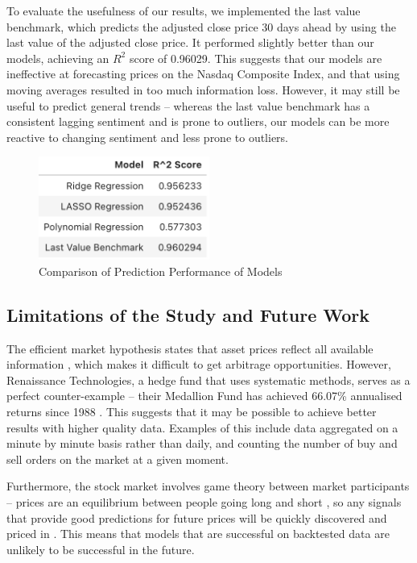 \documentclass[a4paper, 11pt]{article}
\begin{document}
To evaluate the usefulness of our results, we implemented the last value benchmark, which predicts the adjusted close price 30 days ahead by using the last value of the adjusted close price. It performed slightly better than our models, achieving an $R^2$ score of 0.96029. This suggests that our models are ineffective at forecasting prices on the Nasdaq Composite Index, and that using moving averages resulted in too much information loss. However, it may still be useful to predict general trends -- whereas the last value benchmark has a consistent lagging sentiment and is prone to outliers, our models can be more reactive to changing sentiment and less prone to outliers.

\begin{figure}[H]
    \begin{center}
        \includegraphics[width=0.5\textwidth]{Model Results Table.png}
        \caption{Comparison of Prediction Performance of Models}
    \end{center}
\end{figure}

\subsection{Limitations of the Study and Future Work}
The efficient market hypothesis states that asset prices reflect all available information \cite{fama1970efficient}, which makes it difficult to get arbitrage opportunities. However, Renaissance Technologies, a hedge fund that uses systematic methods, serves as a perfect counter-example -- their Medallion Fund has achieved 66.07\% annualised returns since 1988 \cite{cornell2020medallion}. This suggests that it may be possible to achieve better results with higher quality data. Examples of this include data aggregated on a minute by minute basis rather than daily, and counting the number of buy and sell orders on the market at a given moment.

Furthermore, the stock market involves game theory between market participants \cite{allen1998finance} -- prices are an equilibrium between people going long and short \cite{thakor1991game}, so any signals that provide good predictions for future prices will be quickly discovered and priced in \cite{carfi2011fair}. This means that models that are successful on backtested data are unlikely to be successful in the future.
\end{document}
